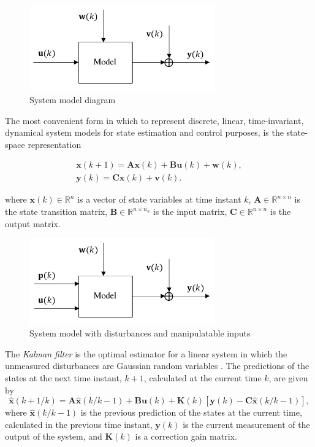 \begin{figure}[htp]
	\centering
	\includegraphics[width=8cm]{images/model_diag_uwvy.pdf}
	\caption{System model diagram}
	\label{fig:model_diag_uwvy}
\end{figure}

The most convenient form in which to represent discrete, linear, time-invariant, dynamical system models for state estimation and control purposes, is the state-space representation

\begin{equation} \label{eq:ss_rep_uwy}
	\begin{aligned}
		\mathbf{x}(k+1) = \mathbf{A} \mathbf{x}(k) + \mathbf{B} \mathbf{u}(k) + \mathbf{w}(k), \\
		\mathbf{y}(k) = \mathbf{C} \mathbf{x}(k) + \mathbf{v}(k).
	\end{aligned}
\end{equation}

where $\mathbf{x}(k) \in \mathbb{R}^n$ is a vector of state variables at time instant $k$, $\mathbf{A} \in \mathbb{R}^{n \times n}$ is the state transition matrix, $\mathbf{B} \in \mathbb{R}^{n \times n_u}$ is the input matrix, $\mathbf{C} \in \mathbb{R}^{n \times n}$ is the output matrix.

\begin{figure}[htp]
	\centering
	\includegraphics[width=8cm]{images/model_diag_upwvy.pdf}
	\caption{System model with disturbances and manipulatable inputs}
	\label{fig:model_diag_upwvy}
\end{figure}

The \textit{Kalman filter} is the optimal estimator for a linear system in which the unmeasured disturbances are Gaussian random variables \citep{kalman_new_1961}. The predictions of the states at the next time instant, $k+1$, calculated at the current time $k$, are given by
\begin{equation} \label{eq:xkp1_hat}
	\mathbf{\hat{x}}(k+1/k) = \mathbf{A} \mathbf{\hat{x}}(k/k-1) + \mathbf{B}\mathbf{u}(k) + 
	\mathbf{K}(k)\left[\mathbf{y}(k) - \mathbf{C} \mathbf{\hat{x}}(k/k-1)\right],
\end{equation}
where $\mathbf{\hat{x}}(k/k-1)$ is the previous prediction of the states at the current time, calculated in the previous time instant, $\mathbf{y}(k)$ is the current measurement of the output of the system, and $\mathbf{K}(k)$ is a correction gain matrix.

